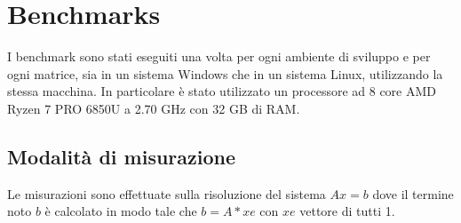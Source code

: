 \documentclass[a4paper, 12pt]{article}
\begin{document}
    \section{Benchmarks}
        I benchmark sono stati eseguiti una volta per ogni ambiente di sviluppo e per ogni matrice, sia in un sistema
        Windows che in un sistema Linux, utilizzando la stessa macchina.
        In particolare è stato utilizzato un processore ad 8 core AMD Ryzen 7 PRO 6850U a 2.70 GHz con 32 GB di RAM.

        \subsection{Modalità di misurazione}

            Le misurazioni sono effettuate sulla risoluzione del sistema $Ax = b$ dove il termine noto $b$ è calcolato
            in modo tale che $b = A*xe$ con $xe$ vettore di tutti 1.\\
\end{document}

